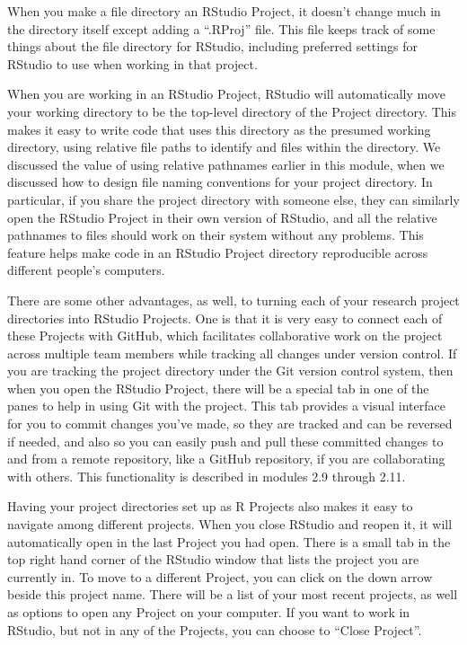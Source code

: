 \documentclass[]{tufte-book}
\begin{document}
When you make a file directory an RStudio Project, it doesn't change much in
the directory itself except adding a ``.RProj'' file. This file keeps track of
some things about the file directory for RStudio, including preferred settings
for RStudio to use when working in that project.

When you are working in an RStudio Project, RStudio will automatically move your
working directory to be the top-level directory of the Project directory. This
makes it easy to write code that uses this directory as the presumed working
directory, using relative file paths to identify and files within the directory.
We discussed the value of using relative pathnames earlier in this module, when
we discussed how to design file naming conventions for your project directory.
In particular, if you share the project directory with someone else, they can
similarly open the RStudio Project in their own version of RStudio, and all the
relative pathnames to files should work on their system without any problems.
This feature helps make code in an RStudio Project directory reproducible across
different people's computers.

There are some other advantages, as well, to turning each of your research
project directories into RStudio Projects. One is that it is very easy to
connect each of these Projects with GitHub, which facilitates collaborative work
on the project across multiple team members while tracking all changes under
version control. If you are tracking the project directory under the Git version
control system, then when you open the RStudio Project, there will be a special
tab in one of the panes to help in using Git with the project. This tab provides
a visual interface for you to commit changes you've made, so they are tracked
and can be reversed if needed, and also so you can easily push and pull these
committed changes to and from a remote repository, like a GitHub repository, if
you are collaborating with others. This functionality is described in modules
2.9 through 2.11.

Having your project directories set up as R Projects also makes it easy to
navigate among different projects. When you close RStudio and reopen it, it will
automatically open in the last Project you had open. There is a small tab in the
top right hand corner of the RStudio window that lists the project you are
currently in. To move to a different Project, you can click on the down arrow
beside this project name. There will be a list of your most recent projects, as
well as options to open any Project on your computer. If you want to work in
RStudio, but not in any of the Projects, you can choose to ``Close Project''.
\end{document}
